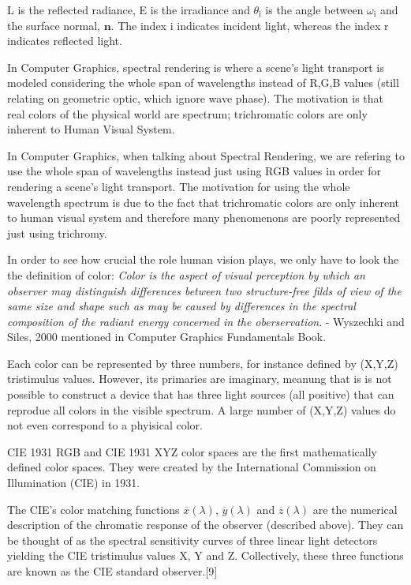 L is the reflected radiance, E is the irradiance and $\theta_{\text{i}}$ is the angle between $\omega_{\text{i}}$ and the surface normal, $\mathbf n$. The index $\text{i}$ indicates incident light, whereas the index $\text{r}$ indicates reflected light.

In Computer Graphics, spectral rendering is where a scene's light transport is modeled considering the whole span of wavelengths instead of R,G,B values (still relating on geometric optic, which ignore wave phase). The motivation is that real colors of the physical world are spectrum; trichromatic colors are only inherent to Human Visual System.

In Computer Graphics, when talking about Spectral Rendering, we are refering to use the whole span of wavelengths instead just using RGB values in order for rendering a scene's light transport. The motivation for using the whole wavelength spectrum is due to the fact that trichromatic colors are only inherent to human visual system and therefore many phenomenons are poorly represented just using trichromy. 

In order to see how crucial the role human vision plays, we only have to look the the definition of color: 
\textit{Color is the aspect of visual perception by which an observer may distinguish differences between two structure-free filds of view of the same size and shape such as may be caused by differences in the spectral composition of the radiant energy concerned in the oberservation}. -  Wyszechki and Siles, 2000 mentioned in Computer Graphics Fundamentals Book. 

Each color can be represented by three numbers, for instance defined by (X,Y,Z) tristimulus values. However, its primaries are imaginary, meanung that is is not possible to construct a device that has three light sources (all positive) that can reprodue all colors in the visible spectrum. A large number of (X,Y,Z) values do not even correspond to a phyisical color. 

CIE 1931 RGB and CIE 1931 XYZ color spaces are the first mathematically defined color spaces. They were created by the International Commission on Illumination (CIE) in 1931.

The CIE's color matching functions $\overline{x}(\lambda)$, $\overline{y}(\lambda)$ and $\overline{z}(\lambda)$ are the numerical description of the chromatic response of the observer (described above). They can be thought of as the spectral sensitivity curves of three linear light detectors yielding the CIE tristimulus values X, Y and Z. Collectively, these three functions are known as the CIE standard observer.[9]

